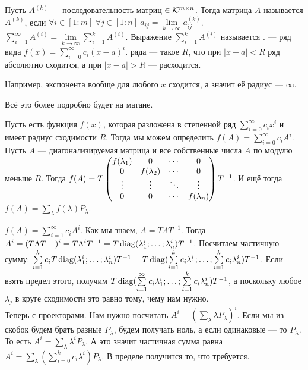 \documentclass{article}
\begin{document}
\begin{itemize}
        \dfn Пусть $A^{(k)}$ --- последовательность матриц $\in{\mathcal{K}}^{m\times n}$. Тогда матрица $A$ называется   $A^{(k)}$, если $\forall i\in[1:m]~\forall j\in[1:n]~a_{ij}=\lim\limits_{k\to\infty}a_{ij}^{(k)}$.
        \dfn {} $\sum\limits_{i=1}^\infty A^{(i)}=\lim\limits_{k\to\infty}\sum\limits_{i=1}^kA^{(i)}$. Выражение $\sum\limits_{i=1}^kA^{(i)}$ называется .
        \dfn {} --- ряд вида $f(x)=\sum\limits_{i=0}^\infty c_i(x-a)^i$.
        \dfn {} ряда --- такое $R$, что при $|x-a|<R$ ряд абсолютно сходится, а при $|x-a|>R$ --- расходится.
        \begin{Example}
            Например, экспонента вообще для любого $x$ сходится, а значит её радиус --- $\infty$.
        \end{Example}
        \begin{Comment}
            Всё это более подробно будет на матане.
        \end{Comment}
        \dfn Пусть есть функция $f(x)$, которая разложена в степенной ряд $\sum\limits_{i=0}^\infty c_ix^i$ и имеет радиус сходимости $R$. Тогда мы можем определить  $f(A)=\sum\limits_{i=0}^\infty c_iA^i$.
        \thm Пусть $A$ --- диагонализируемая матрица и все собственные числа $A$ по модулю меньше $R$. Тогда $f(A)=T\left(\begin{matrix}f(\lambda_1) & 0 & \cdots & 0\\0 & f(\lambda_2) & \cdots & 0\\\vdots & \vdots & \ddots & \vdots\\0 & 0 & \cdots & f(\lambda_n)\end{matrix}\right)T^{-1}$. И ещё тогда $f(A)=\sum\limits_{\lambda}f(\lambda)P_\lambda$.
        \begin{Proof}
            $f(A)=\sum\limits_{i=1}^\infty c_iA^i$. Как мы знаем, $A=T\Lambda T^{-1}$. Тогда $A^i=(T\Lambda T^{-1})^i=T\Lambda^iT^{-1}=T\operatorname{diag}(\lambda_1^i;\ldots;\lambda_n^i)T^{-1}$. Посчитаем частичную сумму: $\sum\limits_{i=1}^kc_iT\operatorname{diag}(\lambda_1^i;\ldots;\lambda_n^i)T^{-1}=T\operatorname{diag}(\sum\limits_{i=1}^kc_i\lambda_1^i;\ldots;\sum\limits_{i=1}^kc_i\lambda_n^i)T^{-1}$. Если взять предел этого, получим $T\operatorname{diag}(\sum\limits_{i=1}^\infty c_i\lambda_1^i;\ldots;\sum\limits_{i=1}^kc_i\lambda_n^i)T^{-1}$, а поскольку любое $\lambda_j$ в круге сходимости это равно тому, чему нам нужно.\\
            Теперь с проекторами. Нам нужно посчитать $A^i=\left(\sum\limits_\lambda\lambda P_\lambda\right)^i$. Если мы из скобок будем брать разные $P_\lambda$, будем получать ноль, а если одинаковые --- то $P_\lambda$. То есть $A^i=\sum\limits_\lambda\lambda^iP_\lambda$. А это значит частичная сумма равна $A^i=\sum\limits_\lambda\left(\sum\limits_{i=0}^kc_i\lambda^i\right)P_\lambda$. В пределе получится то, что требуется.

\end{Proof}
\end{itemize}
\end{document}
